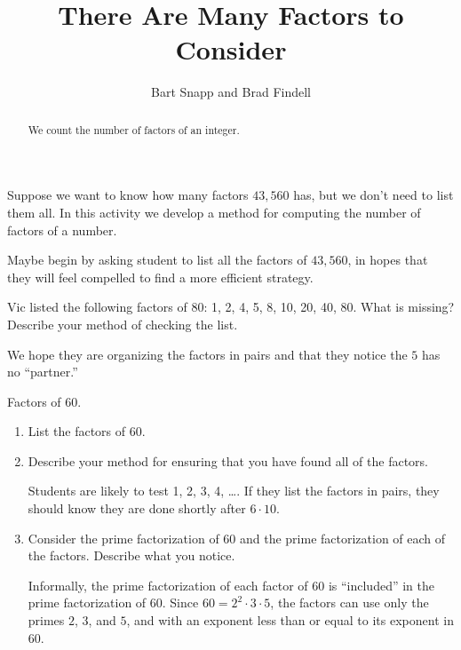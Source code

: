 \documentclass[nooutcomes]{ximera}
\title{There Are Many Factors to Consider}
\author{Bart Snapp and Brad Findell}
\begin{document}
\begin{abstract}
  We count the number of factors of an integer.
\end{abstract}
\maketitle

\label{A:CF}

Suppose we want to know how many factors $43,\!560$ has, but we don't need to list them all.  In this activity we develop a method for computing the number of factors of a number.  

\begin{teachingnote}
Maybe begin by asking student to list all the factors of $43,\!560$, in hopes that they will feel compelled to find a more efficient strategy.
\end{teachingnote}

\begin{problem}
Vic listed the following factors of 80:  1, 2, 4, 5, 8, 10, 20, 40, 80.  What is missing? Describe your method of checking the list.  
\vspace{0.2in}
\begin{teachingnote}
We hope they are organizing the factors in pairs and that they notice the $5$ has no ``partner.''  
\end{teachingnote}
\end{problem}

\begin{problem} Factors of 60. 
\begin{enumerate}
\item List the factors of 60. 
\vspace{0.2in}
\item Describe your method for ensuring that you have found all of the factors. 
\vspace{0.2in}
\begin{teachingnote}
Students are likely to test 1, 2, 3, 4, \dots.  If they list the factors in pairs, they should know they are done shortly after $6\cdot10$. 
\end{teachingnote}
\item Consider the prime factorization of 60 and the prime factorization of each of the factors.  Describe what you notice.   
\vspace{0.2in}
\begin{teachingnote}
Informally, the prime factorization of each factor of $60$ is ``included'' in the prime factorization of $60$.  Since $60=2^2\cdot 3\cdot5$, the factors can use only the primes $2$, $3$, and $5$, and with an exponent less than or equal to its exponent in $60$.  
\end{teachingnote}
\end{enumerate}
\end{problem}
\end{document}
